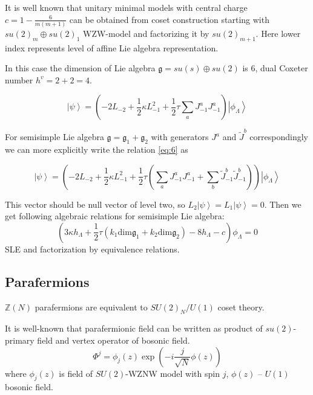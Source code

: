\documentclass[12pt]{article}
\theoremstyle{definition}
\newcommand{\gf}{\mathfrak{g}}
\theoremstyle{definition} \newtheorem{Def}{Definition}
\begin{document}
It is well known that unitary minimal models with central charge $c=1-\frac{6}{m(m+1)}$ can be obtained from coset construction starting with $su(2)_{m}\oplus su(2)_{1}$ WZW-model and factorizing it by $su(2)_{m+1}$. Here lower index represents level of affine Lie algebra representation. 

In this case the dimension of Lie algebra $\gf=su(s)\oplus su(2)$ is 6, dual Coxeter number $h^{v}=2+2=4$. 


\begin{equation}
  \left| \psi\right>=\left(-2 L_{-2}+\frac{1}{2}\kappa L_{-1}^{2}+\frac{1}{2}\tau\sum_{a} J^{a}_{-1} J^{a}_{-1}\right) \left|\phi_{\Lambda}\right>    
\label{eq:6}
\end{equation}

For semisimple Lie algebra $\gf=\gf_{1}+\gf_{2}$ with generators $J^{a}$ and $\tilde{J}^{b}$ correspondingly we can more explicitly write the relation \eqref{eq:6} as 

\begin{equation*}
  \left| \psi\right>=\left(-2 L_{-2}+\frac{1}{2}\kappa L_{-1}^{2}+\frac{1}{2}\tau\left(\sum_{a} J^{a}_{-1} J^{a}_{-1}+\sum_{b}\tilde{J}^{b}_{-1}\tilde{J}^{b}_{-1}\right) \right) \left|\phi_{\Lambda}\right>    
\end{equation*}

This vector should be null vector of level two, so $L_{2}\left|\psi\right>=L_{1}\left|\psi\right>=0$. Then we get following algebraic relations for semisimple Lie algebra:
\begin{equation}
  \label{eq:7}
  \left( 3\kappa h_{\Lambda} +\frac{1}{2} \tau (k_{1} \mathrm{dim} \gf_{1}+k_{2}\mathrm{dim} \gf_{2}) -8 h_{\Lambda} - c\right)\phi_{\Lambda}=0
\end{equation}
SLE and factorization by equivalence relations. 

\subsection{Parafermions}
\label{sec:parafermions}

$\mathbb{Z}(N)$ parafermions are equivalent to $SU(2)_{N}/U(1)$ coset theory.

It is well-known that parafermionic field can be written as product of $su(2)$-primary field and vertex operator of bosonic field. 
\begin{equation*}
  \Phi^{j}=\phi_{j}(z) \exp\left( -i \frac{j}{\sqrt{N}}\phi(z)\right)
\end{equation*}
where $\phi_{j}(z)$ is field of $SU(2)$-WZNW model with spin $j$, $\phi(z)$ -- $U(1)$ bosonic field.
\end{document}
